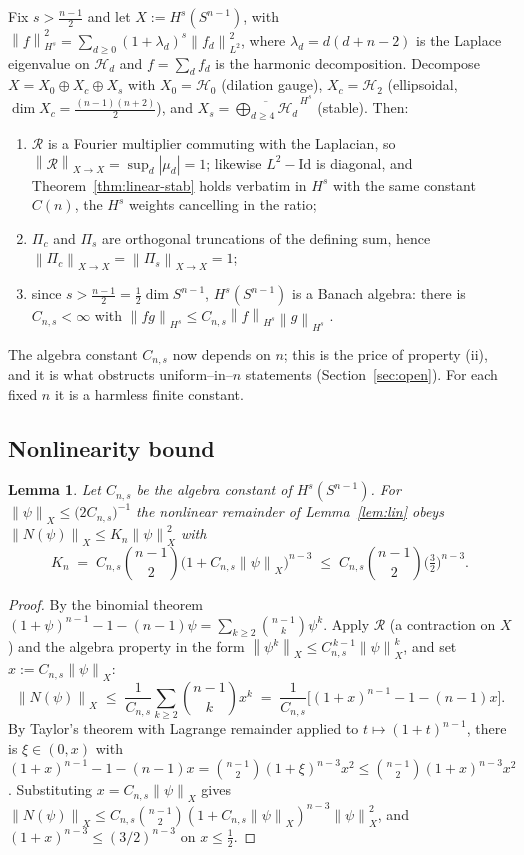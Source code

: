 \documentclass[11pt,reqno]{amsart}
\theoremstyle{plain}
\newtheorem{lemma}[theorem]{Lemma}
\theoremstyle{definition}
\newcommand{\Sph}{S^{n-1}}
\newcommand{\Rad}{\mathcal{R}}
\newcommand{\Hd}[1]{\mathcal{H}_{#1}}
\newcommand{\norm}[1]{\left\lVert #1 \right\rVert}
\newcommand{\abs}[1]{\left\lvert #1 \right\rvert}
\begin{document}
Fix $s>\tfrac{n-1}{2}$ and let $X:=H^s(\Sph)$, with
$\norm f_{H^s}^2=\sum_{d\ge0}(1+\lambda_d)^s\norm{f_d}_{L^2}^2$, where
$\lambda_d=d(d+n-2)$ is the Laplace eigenvalue on $\Hd d$ and $f=\sum_d f_d$
is the harmonic decomposition. Decompose $X=X_0\oplus X_c\oplus X_s$ with
$X_0=\Hd 0$ (dilation gauge), $X_c=\Hd 2$ (ellipsoidal,
$\dim X_c=\tfrac{(n-1)(n+2)}{2}$), and
$X_s=\overline{\bigoplus_{d\ge4}\Hd d}^{\,H^s}$ (stable). Then:
\begin{enumerate}[label=(\roman*)]
\item $\Rad$ is a Fourier multiplier commuting with the Laplacian, so
$\norm{\Rad}_{X\to X}=\sup_d\abs{\mu_d}=1$; likewise $L^2-\mathrm{Id}$ is
diagonal, and Theorem~\ref{thm:linear-stab} holds verbatim in $H^s$ with the
same constant $C(n)$, the $H^s$ weights cancelling in the ratio;
\item $\Pi_c$ and $\Pi_s$ are orthogonal truncations of the defining sum, hence
$\norm{\Pi_c}_{X\to X}=\norm{\Pi_s}_{X\to X}=1$;
\item since $s>\tfrac{n-1}{2}=\tfrac12\dim\Sph$, $H^s(\Sph)$ is a Banach
algebra: there is $C_{n,s}<\infty$ with $\norm{fg}_{H^s}\le C_{n,s}\norm
f_{H^s}\norm g_{H^s}$ \cite[Ch.~4]{Taylor2011}.
\end{enumerate}
The algebra constant $C_{n,s}$ now depends on $n$; this is the price of
property (ii), and it is what obstructs uniform--in--$n$ statements
(Section~\ref{sec:open}). For each fixed $n$ it is a harmless finite constant.

\subsection{Nonlinearity bound}
\begin{lemma}\label{lem:nl-bound}
Let $C_{n,s}$ be the algebra constant of $H^s(\Sph)$. For
$\norm\psi_X\le \big(2C_{n,s}\big)^{-1}$ the nonlinear remainder of
Lemma~\ref{lem:lin} obeys $\norm{N(\psi)}_X\le K_n\norm\psi_X^2$ with
\[
   K_n\;=\;C_{n,s}\binom{n-1}{2}\big(1+C_{n,s}\norm\psi_X\big)^{n-3}
   \;\le\;C_{n,s}\binom{n-1}{2}\Big(\tfrac32\Big)^{n-3}.
\]
\end{lemma}

\begin{proof}
By the binomial theorem $(1+\psi)^{n-1}-1-(n-1)\psi=\sum_{k\ge2}\binom{n-1}{k}
\psi^{k}$. Apply $\Rad$ (a contraction on $X$) and the algebra property in the
form $\norm{\psi^k}_X\le C_{n,s}^{\,k-1}\norm\psi_X^k$, and set
$x:=C_{n,s}\norm\psi_X$:
\[
   \norm{N(\psi)}_X
   \;\le\;\frac{1}{C_{n,s}}\sum_{k\ge2}\binom{n-1}{k}x^{k}
   \;=\;\frac{1}{C_{n,s}}\Big[(1+x)^{n-1}-1-(n-1)x\Big].
\]
By Taylor's theorem with Lagrange remainder applied to $t\mapsto(1+t)^{n-1}$,
there is $\xi\in(0,x)$ with
$(1+x)^{n-1}-1-(n-1)x=\binom{n-1}{2}(1+\xi)^{n-3}x^2
\le\binom{n-1}{2}(1+x)^{n-3}x^2$. Substituting $x=C_{n,s}\norm\psi_X$ gives
$\norm{N(\psi)}_X\le C_{n,s}\binom{n-1}{2}(1+C_{n,s}\norm\psi_X)^{n-3}
\norm\psi_X^2$, and $(1+x)^{n-3}\le(3/2)^{n-3}$ on $x\le\tfrac12$.
\end{proof}
\end{document}
